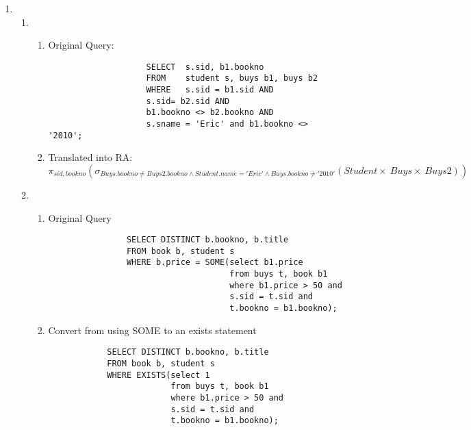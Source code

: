 \documentclass{article}
\begin{document}
\begin{enumerate}
    \item %
        \begin{enumerate}
        \item %
        \begin{enumerate}
                \item Original Query:
                \begin{lstlisting}
                    SELECT  s.sid, b1.bookno
                    FROM    student s, buys b1, buys b2
                    WHERE   s.sid = b1.sid AND
                    s.sid= b2.sid AND
                    b1.bookno <> b2.bookno AND
                    s.sname = 'Eric' and b1.bookno <> '2010';
                \end{lstlisting}

                \item Translated into RA:
                \begin{displaymath}
                    \pi_{sid, bookno}
                        (\sigma_{Buys.bookno \ne Buys2.bookno \wedge Student.name='Eric' \wedge Buys.bookno \ne '2010'}
                            (Student \times\ Buys \times\ Buys2))
                \end{displaymath}

        \end{enumerate}

        \item %
        \begin{enumerate}

            \item Original Query
            \begin{lstlisting}
                SELECT DISTINCT b.bookno, b.title
                FROM book b, student s
                WHERE b.price = SOME(select b1.price
                                     from buys t, book b1
                                     where b1.price > 50 and
                                     s.sid = t.sid and
                                     t.bookno = b1.bookno);
            \end{lstlisting}

            \item Convert from using SOME to an exists statement
            \begin{lstlisting}
            SELECT DISTINCT b.bookno, b.title
            FROM book b, student s
            WHERE EXISTS(select 1
                         from buys t, book b1
                         where b1.price > 50 and
                         s.sid = t.sid and
                         t.bookno = b1.bookno);
            \end{lstlisting}


\end{enumerate}
\end{enumerate}
\end{enumerate}
\end{document}
